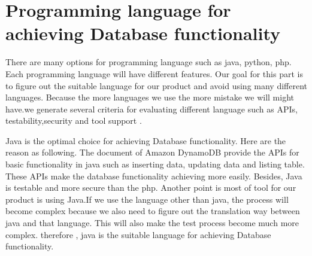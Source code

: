         \section{Programming language for achieving Database functionality}
        There are many options for programming language such as java, python, php. Each programming language will have different features. Our goal for this part is to figure out the suitable language for our product and avoid using many different languages. Because the more languages we use the more mistake we will might have.we generate several criteria for evaluating different language such as APIs, testability,security and tool support .

        \begin{table}[ht]
        \end{table}
                
        \noindent Java is the optimal choice for achieving Database functionality. Here are the reason as following. The document of Amazon DynamoDB provide the APIs for basic functionality in java such as inserting data, updating data and listing table. These APIs make the database functionality achieving more easily. Besides, Java is testable and more secure than the php. Another point is most of tool for our product is using Java.If we use the language other than java, the process will become complex because we also need to figure out the translation way  between java and that language. This will also make the test process become much more complex. therefore , java is the suitable language for achieving Database functionality.
